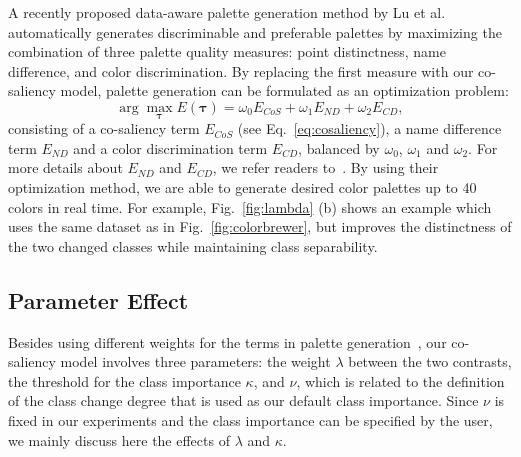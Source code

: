 


A recently proposed data-aware palette generation method by Lu et al.~\cite{Lu21} automatically generates discriminable and preferable palettes by maximizing the combination of three palette quality measures: point distinctness, name difference, and color discrimination.
By replacing the first measure with our co-saliency model, palette generation can be formulated as an optimization problem:
\begin{equation}
\arg\max_{\mathbf{\tau}} E(\mathbf{\tau}) = \omega_0 E_{CoS} + \omega_1 E_{ND} + \omega_2 E_{CD},
\label{eq:energyfunc}
\end{equation}
consisting of a co-saliency term $E_{CoS}$ (see Eq.~\ref{eq:cosaliency}), a name difference term $E_{ND}$ and a color discrimination term $E_{CD}$, balanced by $\omega_0$, $\omega_1$ and $\omega_2$. For more details about $E_{ND}$ and $E_{CD}$, we refer readers to~\cite{Lu21}. By using their optimization method, we are able to generate desired color palettes up to 40 colors in real time. %
For example, Fig.~\ref{fig:lambda} (b) shows an example which uses the same dataset as in Fig.~\ref{fig:colorbrewer}, but improves the distinctness of the two changed classes while maintaining class separability.



\subsection{Parameter Effect}
\label{subsec:parameter}
Besides using different weights for the terms in palette generation~\cite{Lu21}, our co-saliency model involves three parameters: the weight $\lambda$ between the two contrasts, the threshold for the class importance $\kappa$, and $\nu$, which is related to the definition of the class change degree that is used as our default class importance.
Since $\nu$ is fixed in our experiments and the class importance can be specified by the user, we mainly discuss here the effects of $\lambda$  and $\kappa$.

